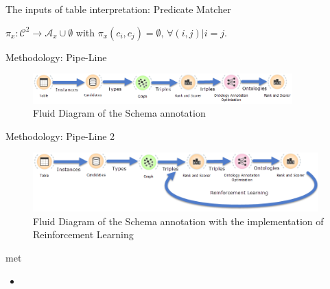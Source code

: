 \documentclass{beamer}
\begin{document}
\begin{frame}{The inputs of table interpretation: Predicate Matcher}

	\begin{definition}
		$\pi_x:\mathcal{C}^2\to \mathcal{A}_x\cup \emptyset$ with $\pi_x(c_i,c_j) =\emptyset,\, \forall (i,j)| i=j$.
	\end{definition}
\end{frame}


\begin{frame}{Methodology: Pipe-Line}
	\begin{figure}
		\includegraphics[width=10cm]{images/diagrams2.png}
		\caption{\label{fig:your-figure2} Fluid Diagram of the Schema annotation}
	\end{figure}
\end{frame}

\begin{frame}{Methodology: Pipe-Line 2}
	\begin{figure}
		\includegraphics[width=11cm]{images/diagrams.png}
		\caption{\label{fig:your-figure2} Fluid Diagram of the Schema annotation with the implementation of Reinforcement Learning}
	\end{figure}
\end{frame}


\begin{frame}{met}
	\begin{itemize}
		\item 
	\end{itemize}
\end{frame}{}
\end{document}
